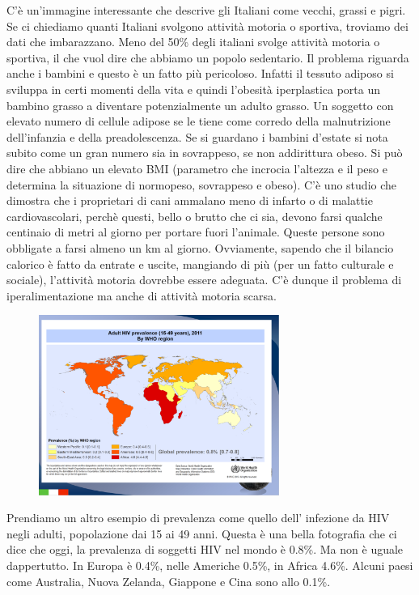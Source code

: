 C'è un'immagine interessante che descrive gli Italiani come vecchi,
grassi e pigri. Se ci chiediamo quanti Italiani svolgono attività
motoria o sportiva, troviamo dei dati che imbarazzano. Meno del 50\%
degli italiani svolge attività motoria o sportiva, il che vuol dire che
abbiamo un popolo sedentario. Il problema riguarda anche i bambini e
questo è un fatto più pericoloso. Infatti il tessuto adiposo si sviluppa
in certi momenti della vita e quindi l'obesità iperplastica porta un
bambino grasso a diventare potenzialmente un adulto grasso. Un soggetto
con elevato numero di cellule adipose se le tiene come corredo della
malnutrizione dell'infanzia e della preadolescenza. Se si guardano i
bambini d'estate si nota subito come un gran numero sia in sovrappeso,
se non addirittura obeso. Si può dire che abbiano un elevato BMI
(parametro che incrocia l'altezza e il peso e determina la situazione di
normopeso, sovrappeso e obeso). C'è uno studio che dimostra che i
proprietari di cani ammalano meno di infarto o di malattie
cardiovascolari, perchè questi, bello o brutto che ci sia, devono farsi
qualche centinaio di metri al giorno per portare fuori l'animale. Queste
persone sono obbligate a farsi almeno un km al giorno. Ovviamente,
sapendo che il bilancio calorico è fatto da entrate e uscite, mangiando
di più (per un fatto culturale e sociale), l'attività motoria dovrebbe
essere adeguata. C'è dunque il problema di iperalimentazione ma anche di
attività motoria scarsa.

\begin{figure}[!ht]
\centering
	\includegraphics[width=0.7\textwidth]{03/image9.png}
\end{figure}

Prendiamo un altro esempio di prevalenza come quello dell' infezione da
HIV negli adulti, popolazione dai 15 ai 49 anni. Questa è una bella
fotografia che ci dice che oggi, la prevalenza di soggetti HIV nel mondo
è 0.8\%. Ma non è uguale dappertutto. In Europa è 0.4\%, nelle Americhe
0.5\%, in Africa 4.6\%. Alcuni paesi come Australia, Nuova Zelanda,
Giappone e Cina sono allo 0.1\%.

